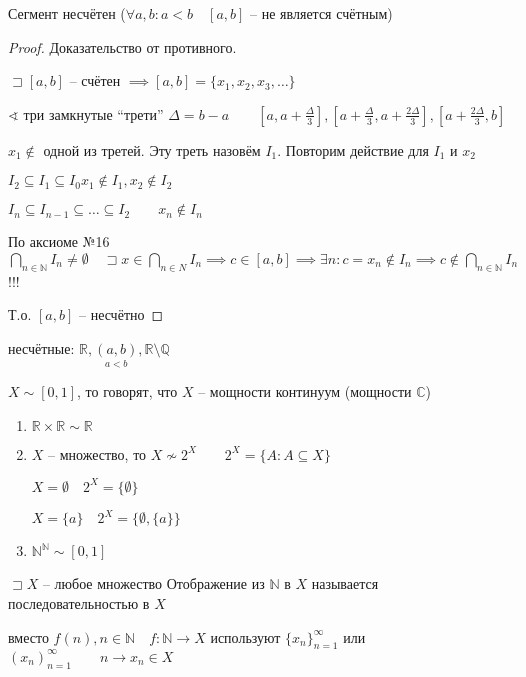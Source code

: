 \documentclass{book}
\newcommand\N{\ensuremath{\mathbb{N}}}
\newcommand\R{\ensuremath{\mathbb{R}}}
\renewcommand\O{\ensuremath{\emptyset}}
\newcommand\Q{\ensuremath{\mathbb{Q}}}
\renewcommand\C{\ensuremath{\mathbb{C}}}
\theoremstyle{definition}
\begin{document}
    \begin{theorem}
        Сегмент несчётен ($\forall a, b:a<b\quad [a,b]$ -- не является счётным)
    \end{theorem}
    \begin{proof}
        Доказательство от противного. 

        $\sqsupset [a,b]$ -- счётен $\implies [a,b] = \{x_1, x_2, x_3, \ldots\}$

        $\sphericalangle$ три замкнутые ``трети'' $\Delta = b-a\qquad [a,a+\frac{\Delta}{3}], [a + \frac{\Delta}{3}, a + \frac{2\Delta}{3}], [a + \frac{2\Delta}{3}, b] $

        $x_1 \not\in $ одной из третей. Эту треть назовём $I_1$. Повторим действие для $I_1$ и $x_2$

        $I_2\subseteq I_1 \subseteq I_0 x_1\not\in I_1, x_2\not\in I_2$

        $I_n\subseteq I_{n-1}\subseteq  \ldots \subseteq  I_2\qquad x_{n} \not\in I_n $

        По аксиоме №16 $\bigcap\limits_{n\in \N } I_n \neq \O \quad \sqsupset x\in \bigcap\limits_{n\in N} I_n \implies c\in [a,b] \implies \exists n: c = x_n\not\in I_n \implies c\not\in \bigcap\limits_{n\in \N } I_n$ !!!

        Т.о. $[a,b]$ -- несчётно
    \end{proof}
    \begin{corollary}
        несчётные: $\R, \underset{a<b}{(a,b)}, \R\setminus \Q$

        $X\sim [0,1]$, то говорят, что $X$ -- мощности континуум (мощности $\C$)
    \end{corollary}
    \begin{problem}
         \begin{enumerate}
             \item 
        $\R\times\R\sim \R$
    \item $X$ -- множество, то $X\not\sim 2^X\qquad 2^X= \{A:A\subseteq X\}$

        $X = \O \quad 2^X = \{\O \}$

        $X = \{a\}\quad 2^X = \{\O , \{a\}\}$
    \item $\N ^{\N }\sim [0,1]$
         \end{enumerate}
    \end{problem}

    \begin{definition}
        $\sqsupset X$ -- любое множество
        Отображение из $\N $ в $X$ называется последовательностью в $X$

        вместо $f(n), n\in \N \quad f:\N \to X$ используют $\{x_n\}_{n=1}^{\infty }$ или $\left( x_n \right) _{n=1}^{\infty }\qquad n\to x_n\in X$
    \end{definition}
\end{document}
